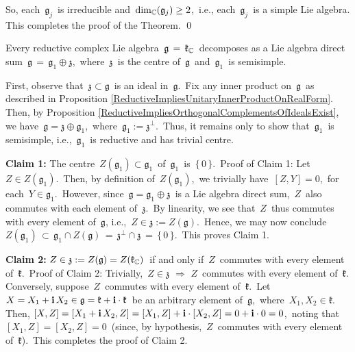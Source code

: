\vskip 0.3cm
\noindent
So, each \,$\mathfrak{g}_{j}$\, is irreducible and \,$\dim_{\mathbb{C}}(\mathfrak{g}_{j}) \geq 2$,\,
i.e., each \,$\mathfrak{g}_{j}$\, is a simple Lie algebra.
This completes the proof of the Theorem.
\qed


\vskip 0.5cm
\begin{proposition}
\mbox{}
\vskip 0.1cm
\noindent
Every reductive complex Lie algebra
\,$\mathfrak{g} \,=\, \mathfrak{k}_{\mathbb{C}}$\,
decomposes as a Lie algebra direct sum
\,$\mathfrak{g} \,=\, \mathfrak{g}_{1} \oplus \mathfrak{z}$,\,
where \,$\mathfrak{z}$\, is the centre of \,$\mathfrak{g}$\,
and \,$\mathfrak{g}_{1}$\, is semisimple.
\end{proposition}
\proof
First, observe that
\,$\mathfrak{z} \subset \mathfrak{g}$\,
is an ideal in \,$\mathfrak{g}$.\,
Fix any inner product on \,$\mathfrak{g}$\, as described in
Proposition \ref{ReductiveImpliesUnitaryInnerProductOnRealForm}.
Then, by Proposition \ref{ReductiveImpliesOrthogonalComplementsOfIdealsExist}, we have
\,$\mathfrak{g} = \mathfrak{z} \oplus \mathfrak{g}_{1}$,\,
where \,$\mathfrak{g}_{1} := \mathfrak{z}^{\perp}$.\,
Thus, it remains only to show that \,$\mathfrak{g}_{1}$\, is semisimple,
i.e., \,$\mathfrak{g}_{1}$\, is reductive and has trivial centre.

\vskip 0.3cm
\noindent
\textbf{Claim 1:}\;\; The centre
\,$Z(\mathfrak{g}_{1}) \subset \mathfrak{g}_{1}$\,
of \,$\mathfrak{g}_{1}$\, is \,$\{\,0\,\}$.\,
\vskip 0.05cm
\noindent
Proof of Claim 1:\;\;
Let \,$Z \in Z(\mathfrak{g}_{1})$.\,
Then, by definition of \,$Z(\mathfrak{g}_{1})$,\,
we trivially have \,$[Z,Y] = 0$,\, for each \,$Y \in \mathfrak{g}_{1}$.\,
However, since \,$\mathfrak{g} = \mathfrak{g}_{1} \oplus \mathfrak{z}$\,
is a Lie algebra direct sum, \,$Z$\, also commutes with each element of
\,$\mathfrak{z}$.\, By linearity, we see that \,$Z$\, thus commutes with
every element of \,$\mathfrak{g}$, i.e.,
\,$Z \in \mathfrak{z} := Z(\mathfrak{g})$.\,
Hence, we may now conclude
\,$
Z(\mathfrak{g}_{1})
\,\subset\,
    \mathfrak{g}_{1} \cap Z(\mathfrak{g})
\, = \,
    \mathfrak{z}^{\perp} \cap \mathfrak{z}
\, = \,
    \{\,0\,\}
$.\,
This proves Claim 1.

\vskip 0.3cm
\noindent
\textbf{Claim 2:}\;\; $Z \in \mathfrak{z} := Z(\mathfrak{g}) = Z(\mathfrak{k}_{\mathbb{C}})$\,
if and only if \,$Z$\, commutes with every element of \,$\mathfrak{k}$.\,
\vskip 0.05cm
\noindent
Proof of Claim 2:\;\;
Trivially, \,$Z \in \mathfrak{z}$ \;$\Longrightarrow$\; $Z$\, commutes with every element of \,$\mathfrak{k}$.\,
Conversely, suppose \,$Z$\, commutes with every element of \,$\mathfrak{k}$.\,
Let \,$X = X_{1} + \mathbf{i}\,X_{2} \in \mathfrak{g} = \mathfrak{k} + \mathbf{i}\cdot\mathfrak{k}$\,
be an arbitrary element of \,$\mathfrak{g}$,\, where \,$X_{1}, X_{2} \in \mathfrak{k}$.\,
Then, $[X,Z] = [X_{1} + \mathbf{i}\,X_{2},Z] = [X_{1},Z] + \mathbf{i}\cdot[X_{2},Z] = 0 + \mathbf{i} \cdot 0 = 0$,\,
noting that \,$[X_{1},Z] = [X_{2},Z] = 0$\,
(since, by hypothesis, \,$Z$\, commutes with every element of \,$\mathfrak{k}$).\,
This completes the proof of Claim 2.

